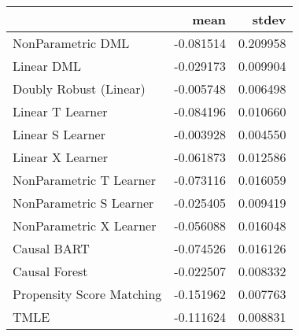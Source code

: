 \begin{tabular}{lrr}
\toprule
{} &      mean &     stdev \\
\midrule
NonParametric DML         & -0.081514 &  0.209958 \\
Linear DML                & -0.029173 &  0.009904 \\
Doubly Robust (Linear)    & -0.005748 &  0.006498 \\
Linear T Learner          & -0.084196 &  0.010660 \\
Linear S Learner          & -0.003928 &  0.004550 \\
Linear X Learner          & -0.061873 &  0.012586 \\
NonParametric T Learner   & -0.073116 &  0.016059 \\
NonParametric S Learner   & -0.025405 &  0.009419 \\
NonParametric X Learner   & -0.056088 &  0.016048 \\
Causal BART               & -0.074526 &  0.016126 \\
Causal Forest             & -0.022507 &  0.008332 \\
Propensity Score Matching & -0.151962 &  0.007763 \\
TMLE                      & -0.111624 &  0.008831 \\
\bottomrule
\end{tabular}
